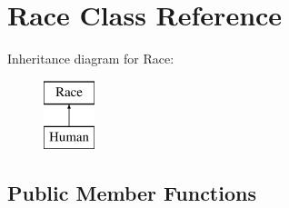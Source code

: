 \hypertarget{class_race}{}\section{Race Class Reference}
\label{class_race}
Inheritance diagram for Race\+:\begin{figure}[H]
\begin{center}
\leavevmode
\includegraphics[height=2.000000cm]{class_race}
\end{center}
\end{figure}
\subsection*{Public Member Functions}
